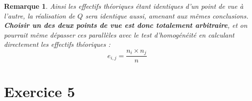\documentclass[a4paper,oneside,12pt]{article}
\theoremstyle{plain}
\newtheorem*{remark}{Remarque}
\begin{document}
\begin{enumerate}
\begin{remark}
        Ainsi les effectifs théoriques étant identiques d'un point de vue à l'autre, la réalisation de $Q$ sera identique aussi, amenant aux mêmes conclusions. \textbf{Choisir un des deux points de vue est donc totalement arbitraire}, et on pourrait même dépasser ces parallèles avec le test d'homogénéité en calculant directement les effectifs théoriques :
        $$e_{i,j} = \frac{n_i\times n_j}{n}$$
    \end{remark}


    
\end{enumerate}


\section*{Exercice 5}
\end{document}
